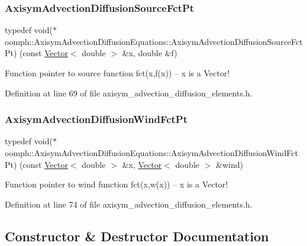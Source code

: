 \subsubsection{\texorpdfstring{Axisym\+Advection\+Diffusion\+Source\+Fct\+Pt}{AxisymAdvectionDiffusionSourceFctPt}}
{\footnotesize\ttfamily typedef void($\ast$ oomph\+::\+Axisym\+Advection\+Diffusion\+Equations\+::\+Axisym\+Advection\+Diffusion\+Source\+Fct\+Pt) (const \hyperlink{classoomph_1_1Vector}{Vector}$<$ double $>$ \&x, double \&f)}



Function pointer to source function fct(x,f(x)) -- x is a Vector! 



Definition at line 69 of file axisym\+\_\+advection\+\_\+diffusion\+\_\+elements.\+h.

\mbox{\label{classoomph_1_1AxisymAdvectionDiffusionEquations_a53ee8d4a13b53896d66020591a8224b0}} 
\subsubsection{\texorpdfstring{Axisym\+Advection\+Diffusion\+Wind\+Fct\+Pt}{AxisymAdvectionDiffusionWindFctPt}}
{\footnotesize\ttfamily typedef void($\ast$ oomph\+::\+Axisym\+Advection\+Diffusion\+Equations\+::\+Axisym\+Advection\+Diffusion\+Wind\+Fct\+Pt) (const \hyperlink{classoomph_1_1Vector}{Vector}$<$ double $>$ \&x, \hyperlink{classoomph_1_1Vector}{Vector}$<$ double $>$ \&wind)}



Function pointer to wind function fct(x,w(x)) -- x is a Vector! 



Definition at line 74 of file axisym\+\_\+advection\+\_\+diffusion\+\_\+elements.\+h.



\subsection{Constructor \& Destructor Documentation}
\mbox{\label{classoomph_1_1AxisymAdvectionDiffusionEquations_ab095111fa0c06ea10810534711d3e25d}} 

